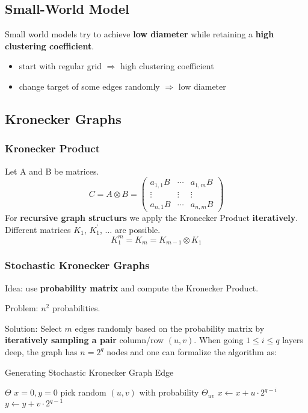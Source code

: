 \documentclass[parskip=full]{scrartcl}
\begin{document}
\subsection{Small-World Model}
Small world models try to achieve \textbf{low diameter} while retaining a \textbf{high clustering coefficient}.
\begin{itemize}
	\item start with regular grid $\Rightarrow$ high clustering coefficient
	\item change target of some edges randomly $\Rightarrow$ low diameter
\end{itemize}

\subsection{Kronecker Graphs \cite{leskovec2009kronecker}}

\subsubsection{Kronecker Product}
Let A and B be matrices.
\[C = A \otimes B = 
\begin{pmatrix}
a_{1,1}B & \cdots & a_{1,m}B \\
\vdots & \vdots & \vdots \\
a_{n,1}B & \cdots & a_{n,m}B
\end{pmatrix}\]
For \textbf{recursive graph structurs} we apply the Kronecker Product \textbf{iteratively}. Different matrices $K_1$, $K_1^{'}$, $\ldots$ are possible.
\[K_1^{m} = K_m = K_{m-1} \otimes K_1\]

\subsubsection{Stochastic Kronecker Graphs}
Idea: use \textbf{probability matrix} and compute the Kronecker Product.

Problem: $n^2$ probabilities.

Solution: Select $m$ edges randomly based on the probability matrix by \textbf{iteratively sampling a pair} column/row $(u,v)$.\newline
When going $1 \leqslant i \leqslant q$ layers deep, the graph has $n = 2^q$ nodes and one can formalize the algorithm as:
\begin{algorithm}
\caption{Generating Stochastic Kronecker Graph Edge}
\begin{algorithmic}
	\State $\Theta$ 
	\State $x = 0, y = 0$ 
		\State pick random $(u,v)$ with probability $\Theta_{uv}$
		\State $x \gets x + u \cdot 2^{q-i}$
		\State $y \gets y + v \cdot 2^{q-1}$
	\EndFor
\end{algorithmic}
\end{algorithm}
\end{document}
